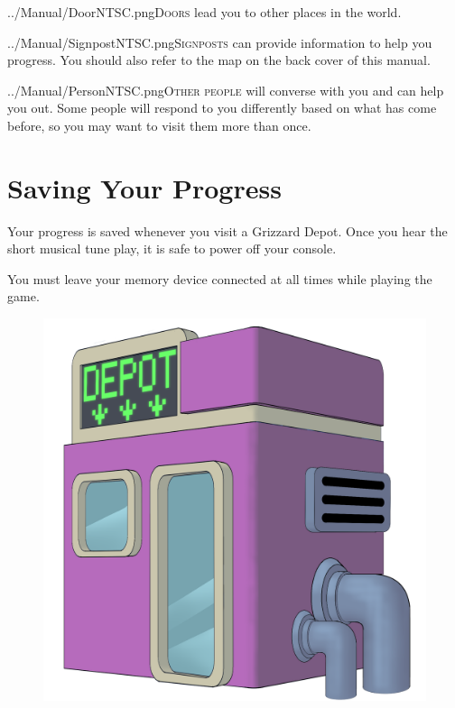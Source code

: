\documentclass[10pt,twocolumn,openany,article]{memoir}
\newcommand\TV{NTSC} %
\begin{document}
\fi

\lettrine[image=true,                lines=5,               findent=3pt,
nindent=3pt]{../Manual/Door\TV.png}{Doors} lead  you to other  places in
the world.

\vspace{30pt}

\lettrine[image=true,                lines=5,               findent=3pt,
nindent=3pt]{../Manual/Signpost\TV.png}{Signposts}      can      provide
information to  help you progress. You  should also refer to  the map on
the back cover of this manual.

\lettrine[image=true,                lines=5,               findent=3pt,
nindent=3pt]{../Manual/Person\TV.png}{Other  people} will  converse with
you and  can help you out.  Some people will respond  to you differently
based  on what  has come  before, so  you may  want to  visit them  more
than once.


\ifdefined\NOSAVE\else

\section{Saving Your Progress}

Your progress  is saved whenever  you visit  a Grizzard Depot.  Once you
hear the short musical tune play, it is safe to power off your console.

\ifdefined\ATARIAGESAVE\else

You must leave  your memory device connected at all  times while playing
the game.

\fi \fi

\begin{figure}[t]
  \begin{center}
    \includegraphics[width=2\columnwidth]{../Manual/GrizzardDepot.png}
  \end{center}
\end{figure}
\end{document}
